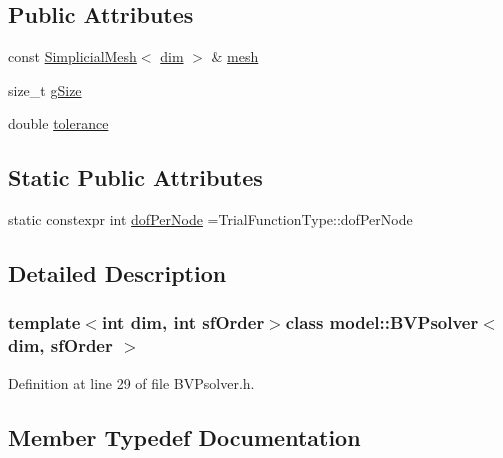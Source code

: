 \subsection*{Public Attributes}
\begin{DoxyCompactItemize}
\item 
const \hyperlink{classmodel_1_1_simplicial_mesh}{Simplicial\+Mesh}$<$ \hyperlink{plot_nd_a_8m_a382f3ca768b275b8d563604f7fc7df73}{dim} $>$ \& \hyperlink{classmodel_1_1_b_v_psolver_a6148bf16d191dcc29291c3f173821884}{mesh}
\item 
size\+\_\+t \hyperlink{classmodel_1_1_b_v_psolver_a872a87ae25d1fd48774ea64c11db42b0}{g\+Size}
\item 
double \hyperlink{classmodel_1_1_b_v_psolver_a5c184b11b6a8064ffaf99226ffcd7984}{tolerance}
\end{DoxyCompactItemize}
\subsection*{Static Public Attributes}
\begin{DoxyCompactItemize}
\item 
static constexpr int \hyperlink{classmodel_1_1_b_v_psolver_ab34cc50436650a715cf182a4dc8edade}{dof\+Per\+Node} =Trial\+Function\+Type\+::dof\+Per\+Node
\end{DoxyCompactItemize}


\subsection{Detailed Description}
\subsubsection*{template$<$int dim, int sf\+Order$>$class model\+::\+B\+V\+Psolver$<$ dim, sf\+Order $>$}



Definition at line 29 of file B\+V\+Psolver.\+h.



\subsection{Member Typedef Documentation}
\hypertarget{classmodel_1_1_b_v_psolver_abf2cbb433fe3755ad102b97e8c0e5797}{}
